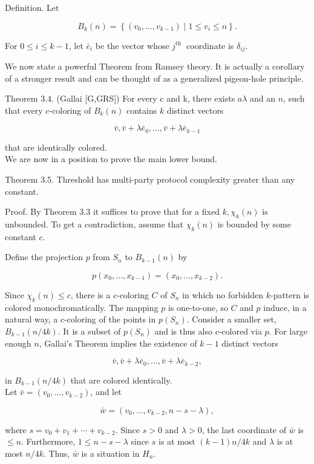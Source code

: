 \documentclass[10pt]{article}
\begin{document}
Definition. Let

$$
B_{k}(n)=\left\{\left(v_{0}, \ldots, v_{k-1}\right) \mid 1 \leq v_{i} \leq n\right\} .
$$

For $0 \leq i \leq k-1$, let $\bar{e}_{i}$ be the vector whose $j^{\text {th }}$ coordinate is $\delta_{i j}$.

We now state a powerful Theorem from Ramsey theory. It is actually a corollary of a stronger result and can be thought of as a generalized pigeon-hole principle.

Theorem 3.4. (Gallai [G,GRS]) For every c and k, there exists $a \lambda$ and an $n$, such that every $c$-coloring of $B_{k}(n)$ contains $k$ distinct vectors

$$
\bar{v}, \bar{v}+\lambda \bar{e}_{0}, \ldots, \bar{v}+\lambda \bar{e}_{k-1}
$$

that are identically colored.\\
We are now in a position to prove the main lower bound.

Theorem 3.5. Threshold has multi-party protocol complexity greater than any constant.

Proof. By Theorem 3.3 it suffices to prove that for a fixed $k, \chi_{k}(n)$ is unbounded. To get a contradiction, assume that $\chi_{k}(n)$ is bounded by some constant $c$.

Define the projection $p$ from $S_{n}$ to $B_{k-1}(n)$ by

$$
p\left(x_{0}, \ldots, x_{k-1}\right)=\left(x_{0}, \ldots, x_{k-2}\right) .
$$

Since $\chi_{k}(n) \leq c$, there is a $c$-coloring $C$ of $S_{n}$ in which no forbidden $k$-pattern is colored monochromatically. The mapping $p$ is one-to-one, so $C$ and $p$ induce, in a natural way, a $c$-coloring of the points in $p\left(S_{n}\right)$. Consider a smaller set, $B_{k-1}(n / 4 k)$. It is a subset of $p\left(S_{n}\right)$ and is thus also $c$-colored via $p$. For large enough $n$, Gallai's Theorem implies the existence of $k-1$ distinct vectors

$$
\bar{v}, \bar{v}+\lambda \bar{e}_{0}, \ldots, \bar{v}+\lambda \bar{e}_{k-2},
$$

in $B_{k-1}(n / 4 k)$ that are colored identically.\\
Let $\bar{v}=\left(v_{0}, \ldots, v_{k-2}\right)$, and let

$$
\bar{w}=\left(v_{0}, \ldots, v_{k-2}, n-s-\lambda\right),
$$

where $s=v_{0}+v_{1}+\cdots+v_{k-2}$. Since $s>0$ and $\lambda>0$, the last coordinate of $\bar{w}$ is $\leq n$. Furthermore, $1 \leq n-s-\lambda$ since $s$ is at most $(k-1) n / 4 k$ and $\lambda$ is at most $n / 4 k$. Thus, $\bar{w}$ is a situation in $H_{n}$.
\end{document}
